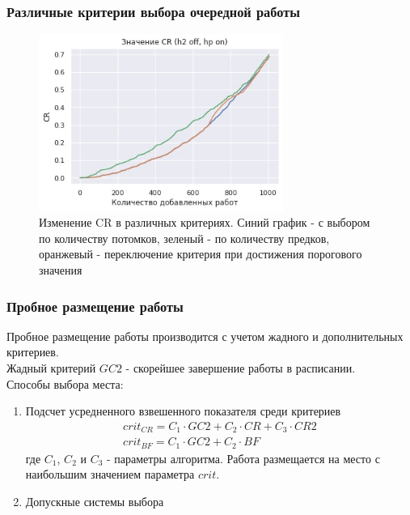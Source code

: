 \begin{frame}
    \frametitle{Различные критерии выбора очередной работы}
    \begin{figure}
        \includegraphics[width=8cm]{imgs/GC1_variants.jpg}
        \caption*{Изменение CR в различных критериях. Синий график - с выбором по количеству потомков, зеленый - по количеству предков, оранжевый - переключение критерия при достижения порогового значения}
    \end{figure}
\end{frame}

\begin{frame}
    \frametitle{Пробное размещение работы}
    Пробное размещение работы производится с учетом  жадного и дополнительных критериев. \\
    Жадный критерий $GC2$ - скорейшее завершение работы в расписании. \\
    Способы выбора места:
    \begin{enumerate}
        \item Подсчет усредненного взвешенного показателя среди критериев \\
              \begin{gather*}
                  crit_{CR} = C_1 \cdot GC2 + C_2 \cdot CR + C_3 \cdot CR2 \\
                  crit_{BF} = C_1 \cdot GC2 + C_2 \cdot BF
              \end{gather*}
              где $C_1$, $C_2$ и $C_3$ - параметры алгоритма. Работа размещается на место с наибольшим значением параметра $crit$.
        \item Допускные системы выбора
    \end{enumerate}
\end{frame}

